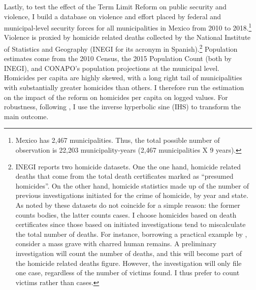 \documentclass[12pt]{amsart}
\numberwithin{equation}{section}
\theoremstyle{definition}
\theoremstyle{definition}
\theoremstyle{definition}
\begin{document}
Lastly, to test the effect of the Term Limit Reform on public security and violence, I build a database on violence and effort placed by federal and municipal-level security forces for all municipalities in Mexico from 2010 to 2018.\footnote{Mexico has 2,467 municipalities. Thus, the total possible number of observation is 22,203 municipality-years (2,467 municipalities X 9 years).} Violence is proxied by homicide related deaths collected by the National Institute of Statistics and Geography (INEGI for its acronym in Spanish).\footnote{INEGI reports two homicide datasets. One the one hand, homicide related deaths that come from the total death certificates marked as ``presumed homicides''. On the other hand, homicide statistics made up of the number of previous investigations initiated for the crime of homicide, by year and state. As noted by \citet{rivera_2012} these datasets do not coincide for a simple reason: the former counts bodies, the latter counts cases. I choose homicides based on death certificates since those based on initiated investigations tend to miscalculate the total number of deaths. For instance, borrowing a practical example by \citet{rivera_2012}, consider a mass grave with charred human remains. A preliminary investigation will count the number of deaths, and this will become part of the homicide related deaths figure. However, the investigation will only file one case, regardless of the number of victims found. I thus prefer to count victims rather than cases.} Population estimates come from the 2010 Census, the 2015 Population Count (both by INEGI), and CONAPO's population projections at the municipal level. Homicides per capita are highly skewed, with a long right tail of municipalities with substantially greater homicides than others. I therefore run the estimation on the impact of the reform on homicides per capita on logged values. For robustness, following \citet{mackinnon_maggie_1990}, I use the inverse hyperbolic sine (IHS) to transform the main outcome. %
\end{document}
